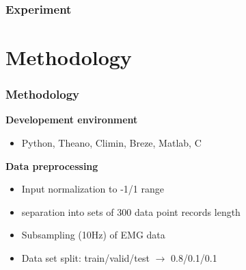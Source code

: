 \documentclass{beamer}
\begin{document}
\begin{frame}
    \frametitle{Experiment}
    \begin{figure}
    \end{figure}
\end{frame}


\section{Methodology}

\begin{frame}
\frametitle{Methodology}

\textbf{Developement environment}
\begin{itemize}
    \item Python, Theano, Climin, Breze, Matlab, C
\end{itemize}

\vspace{20px}
\textbf{Data preprocessing}
\begin{itemize}
    \item Input normalization to -1/1 range%
    \item separation into sets of 300 data point records length
   	\item Subsampling (10Hz) of EMG data
   	\item Data set split: train/valid/test $\rightarrow$ 0.8/0.1/0.1
\end{itemize}



\end{frame}
\end{document}
